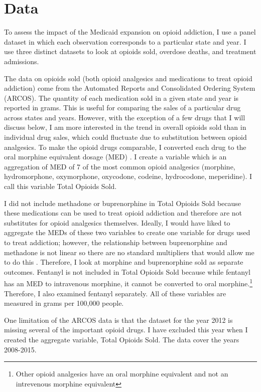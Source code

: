 \documentclass[11pt]{article}
\begin{document}
\section{Data}
To assess the impact of the Medicaid expansion on opioid addiction, I use a panel dataset in which each observation corresponds to a particular state and year.  I use three distinct datasets to look at opioids sold, overdose deaths, and treatment admissions. 

The data on opioids sold (both opioid analgesics and medications to treat opioid addiction) come from the Automated Reports and Consolidated Ordering System (ARCOS).  The quantity of each medication sold in a given state and year is reported in grams. This is useful for comparing the sales of a particular drug across states and years. However, with the exception of a few drugs that I will discuss below, I am more interested in the trend in overall opioids sold than in individual drug sales, which could fluctuate due to substitution between opioid analgesics.  To make the opioid drugs comparable, I converted each drug to the oral morphine equivalent dosage (MED) \citep{Gordon1999}. I create a variable which is an aggregation of MED of 7 of the most common opioid analgesics (morphine, hydromorphone, oxymorphone, oxycodone, codeine, hydrocodone, meperidine).  I call this variable Total Opioids Sold.  
 
I did not include methadone or buprenorphine in Total Opioids Sold because these medications can be used to treat opioid addiction and therefore are not substitutes for opioid analgesics themselves.  Ideally, I would have liked to aggregate the MEDs of these two variables to create one variable for drugs used to treat addiction; however, the relationship between buprenorphine and methadone is not linear so there are no standard multipliers that would allow me to do this \citep{Wallera}.  Therefore, I look at morphine and buprenorphine sold as separate outcomes.  Fentanyl is not included in Total Opioids Sold because while fentanyl has an MED to intravenous morphine, it cannot be converted to oral morphine.\footnote{Other opioid analgesics have an oral morphine equivalent and not an intrevenous morphine equivalent}  Therefore, I also examined fentanyl separately.  All of these variables are measured in grams per 100,000 people.

One limitation of the ARCOS data is that the dataset for the year 2012 is missing several of the important opioid drugs. I have excluded this year when I created the aggregate variable, Total Opioids Sold.  The data cover the years 2008-2015.
\end{document}
